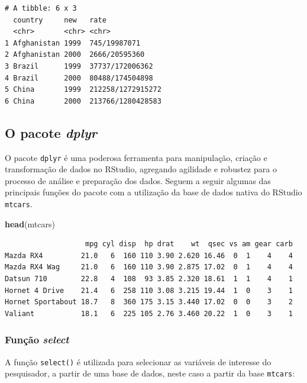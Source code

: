\documentclass[12pt,brazil,oneside]{book}
\newenvironment{Shaded}{\begin{snugshade}}{\end{snugshade}}
\newcommand{\KeywordTok}[1]{\textcolor[rgb]{0.13,0.29,0.53}{\textbf{#1}}}
\newcommand{\NormalTok}[1]{#1}
\begin{document}
\begin{verbatim}
# A tibble: 6 x 3
  country     new   rate             
  <chr>       <chr> <chr>            
1 Afghanistan 1999  745/19987071     
2 Afghanistan 2000  2666/20595360    
3 Brazil      1999  37737/172006362  
4 Brazil      2000  80488/174504898  
5 China       1999  212258/1272915272
6 China       2000  213766/1280428583
\end{verbatim}

\hypertarget{o-pacote-dplyr}{%
\subsection{\texorpdfstring{O pacote \emph{dplyr}}{O pacote dplyr}}\label{o-pacote-dplyr}}

O pacote \texttt{dplyr} é uma poderosa ferramenta para manipulação, criação e transformação de dados no RStudio, agregando agilidade e robustez para o processo de análise e preparação dos dados. Seguem a seguir algumas das principais funções do pacote com a utilização da base de dados nativa do RStudio \texttt{mtcars}.

\begin{Shaded}
\begin{Highlighting}[]
\KeywordTok{head}\NormalTok{(mtcars)}
\end{Highlighting}
\end{Shaded}

\begin{verbatim}
                   mpg cyl disp  hp drat    wt  qsec vs am gear carb
Mazda RX4         21.0   6  160 110 3.90 2.620 16.46  0  1    4    4
Mazda RX4 Wag     21.0   6  160 110 3.90 2.875 17.02  0  1    4    4
Datsun 710        22.8   4  108  93 3.85 2.320 18.61  1  1    4    1
Hornet 4 Drive    21.4   6  258 110 3.08 3.215 19.44  1  0    3    1
Hornet Sportabout 18.7   8  360 175 3.15 3.440 17.02  0  0    3    2
Valiant           18.1   6  225 105 2.76 3.460 20.22  1  0    3    1
\end{verbatim}

\hypertarget{funcao-select}{%
\subsubsection{\texorpdfstring{Função \emph{select}}{Função select}}\label{funcao-select}}

A função \texttt{select()} é utilizada para selecionar as variáveis de interesse do pesquisador, a partir de uma base de dados, neste caso a partir da base \texttt{mtcars}:
\end{document}
